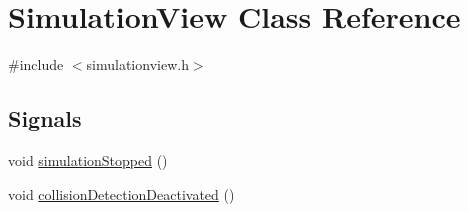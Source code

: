 \hypertarget{classSimulationView}{
\section{\-Simulation\-View \-Class \-Reference}
\label{d9/df6/classSimulationView}
}


{\ttfamily \#include $<$simulationview.\-h$>$}

\subsection*{\-Signals}
\begin{DoxyCompactItemize}
\item 
void \hyperlink{classSimulationView_a4198d47f7517525c5702a9bc6e1e9369}{simulation\-Stopped} ()
\item 
void \hyperlink{classSimulationView_ac6d069baef5c77cff2b8ada065950ab4}{collision\-Detection\-Deactivated} ()
\end{DoxyCompactItemize}
